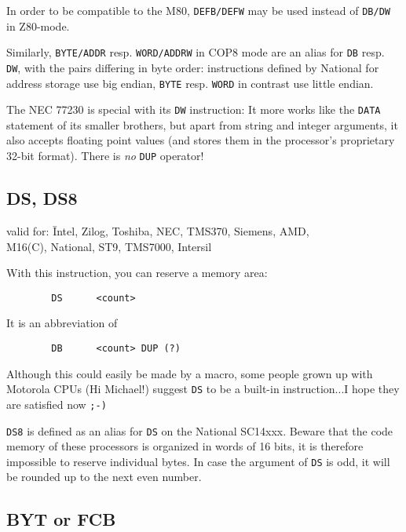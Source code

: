 \documentclass[12pt,twoside]{report}
\makeatletter
\newcommand{\tty}[1]{{\tt #1}}
\newcommand{\ttindex}[1]{\index{#1@{\tt #1}}}
\makeatother
\begin{document}
In order to be compatible to the M80, \tty{DEFB/DEFW} may be used instead of
\tty{DB/DW} in Z80-mode.

Similarly, \tty{BYTE/ADDR} resp. \tty{WORD/ADDRW} in COP8 mode are an
alias for \tty{DB} resp. \tty{DW}, with the pairs differing in byte order:
instructions defined by National for address storage use big endian,
\tty{BYTE} resp. \tty{WORD} in contrast use little endian.

The NEC 77230 is special with its \tty{DW} instruction: It more works like
the \tty{DATA} statement of its smaller brothers, but apart from string
and integer arguments, it also accepts floating point values (and stores
them in the processor's proprietary 32-bit format). There is {\em no}
\tty{DUP} operator!


\subsection{DS, DS8}
\ttindex{DS}
\ttindex{DS8}

{\em\begin{tabbing}
valid for: \= Intel, Zilog, Toshiba, NEC, TMS370, Siemens, AMD, \\
           \> M16(C), National, ST9, TMS7000, Intersil
\end{tabbing}}

With this instruction, you can reserve a memory area:
\begin{verbatim}
        DS      <count>
\end{verbatim}
It is an abbreviation of
\begin{verbatim}
        DB      <count> DUP (?)
\end{verbatim}
Although this could easily be made by a macro, some people grown up
with Motorola CPUs (Hi Michael!) suggest \tty{DS} to be a built-in
instruction...I hope they are satisfied now \tty{;-)}

{\tt DS8} is defined as an alias for {\tt DS} on the National SC14xxx. 
Beware that the code memory of these processors is organized in words of
16 bits, it is therefore impossible to reserve individual bytes.  In case
the argument of {\tt DS} is odd, it will be rounded up to the next even
number.


\subsection{BYT or FCB}
\ttindex{BYT}\ttindex{FCB}
\end{document}
